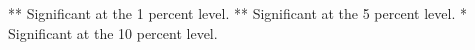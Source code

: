 \begin{table}[h]
\begin{threeparttable}
\begin{subtable}[t]{\linewidth}
\begin{tabular}{|c|cccccccccccccc}
\end{tabular}

\begin{tablenotes}

\item *** Significant at the 1 percent level.    
** Significant at the 5 percent level.   
* Significant at the 10 percent level.
\end{tablenotes}

\end{subtable}

\end{threeparttable}

\end{table}






